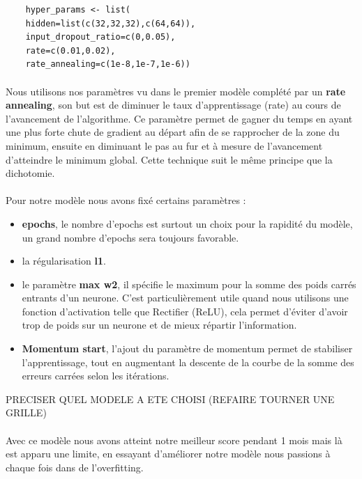 \documentclass[14pt, openany]{article}
\begin{document}
\begin{verbatim}
    hyper_params <- list(
    hidden=list(c(32,32,32),c(64,64)),
    input_dropout_ratio=c(0,0.05),
    rate=c(0.01,0.02),
    rate_annealing=c(1e-8,1e-7,1e-6))
\end{verbatim}

\paragraph{}
Nous utilisons nos paramètres vu dans le premier modèle complété par un \textbf{rate annealing}, son but est de diminuer le taux d'apprentissage (rate) au cours de l'avancement de l'algorithme. Ce paramètre permet de gagner du temps en ayant une plus forte chute de gradient au départ afin de se rapprocher de la zone du minimum, ensuite en diminuant le pas au fur et à mesure de l'avancement d'atteindre le minimum global. Cette technique suit le même principe que la dichotomie.

\paragraph{}
Pour notre modèle nous avons fixé certains paramètres :
\begin{itemize}
    \item \textbf{epochs}, le nombre d'epochs est surtout un choix pour la rapidité du modèle, un grand nombre d'epochs sera toujours favorable.
    \item la régularisation \textbf{l1}.
    \item le paramètre \textbf{max w2}, il spécifie le maximum pour la somme des poids carrés entrants d'un neurone. C'est particulièrement utile quand nous utilisons une fonction d'activation telle que Rectifier (ReLU), cela permet d'éviter d'avoir trop de poids sur un neurone et de mieux répartir l'information.
    \item \textbf{Momentum start}, l’ajout du paramètre de momentum permet de stabiliser l’apprentissage, tout en augmentant la descente de la courbe de la somme des erreurs carrées selon les itérations.
\end{itemize}

PRECISER QUEL MODELE A ETE CHOISI (REFAIRE TOURNER UNE GRILLE)


\paragraph{}
Avec ce modèle nous avons atteint notre meilleur score pendant 1 mois mais là est apparu une limite, en essayant d'améliorer notre modèle nous passions à chaque fois dans de l'overfitting.
\end{document}
